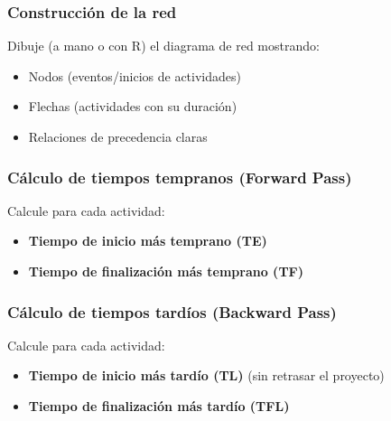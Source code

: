 \documentclass[12pt,a4paper]{article}
\begin{document}
	\subsubsection{Construcción de la red}
	
	Dibuje (a mano o con R) el diagrama de red mostrando:
	
	\begin{itemize}
		\item Nodos (eventos/inicios de actividades)
		\item Flechas (actividades con su duración)
		\item Relaciones de precedencia claras
	\end{itemize}
	
	\subsubsection{Cálculo de tiempos tempranos (Forward Pass)}
	
	Calcule para cada actividad:
	
	\begin{itemize}
		\item \textbf{Tiempo de inicio más temprano (TE)}
		\item \textbf{Tiempo de finalización más temprano (TF)}
	\end{itemize}
	
%	
	
	\subsubsection{Cálculo de tiempos tardíos (Backward Pass)}
	
	Calcule para cada actividad:
	
	\begin{itemize}
		\item \textbf{Tiempo de inicio más tardío (TL)} (sin retrasar el proyecto)
		\item \textbf{Tiempo de finalización más tardío (TFL)}
	\end{itemize}
	
\end{document}
